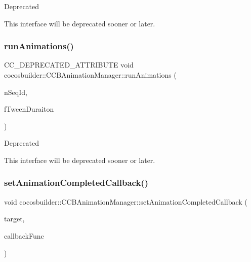 \begin{DoxyRefDesc}{Deprecated}
\item[\hyperlink{deprecated__deprecated000307}{Deprecated}]This interface will be deprecated sooner or later. \end{DoxyRefDesc}
\mbox{\label{classcocosbuilder_1_1CCBAnimationManager_a4c1b1a2f7b02e1666062885f74736340}} 
\subsubsection{\texorpdfstring{run\+Animations()}{runAnimations()}\hspace{0.1cm}{\footnotesize\ttfamily [6/6]}}
{\footnotesize\ttfamily C\+C\+\_\+\+D\+E\+P\+R\+E\+C\+A\+T\+E\+D\+\_\+\+A\+T\+T\+R\+I\+B\+U\+TE void cocosbuilder\+::\+C\+C\+B\+Animation\+Manager\+::run\+Animations (\begin{DoxyParamCaption}\item[{int}]{n\+Seq\+Id,  }\item[{float}]{f\+Tween\+Duraiton }\end{DoxyParamCaption})}

\begin{DoxyRefDesc}{Deprecated}
\item[\hyperlink{deprecated__deprecated000308}{Deprecated}]This interface will be deprecated sooner or later. \end{DoxyRefDesc}
\mbox{\label{classcocosbuilder_1_1CCBAnimationManager_a52729b235eae531b6b4607ca1dca80ab}} 
\subsubsection{\texorpdfstring{set\+Animation\+Completed\+Callback()}{setAnimationCompletedCallback()}\hspace{0.1cm}{\footnotesize\ttfamily [1/2]}}
{\footnotesize\ttfamily void cocosbuilder\+::\+C\+C\+B\+Animation\+Manager\+::set\+Animation\+Completed\+Callback (\begin{DoxyParamCaption}\item[{cocos2d\+::\+Ref $\ast$}]{target,  }\item[{cocos2d\+::\+S\+E\+L\+\_\+\+Call\+Func}]{callback\+Func }\end{DoxyParamCaption})}


